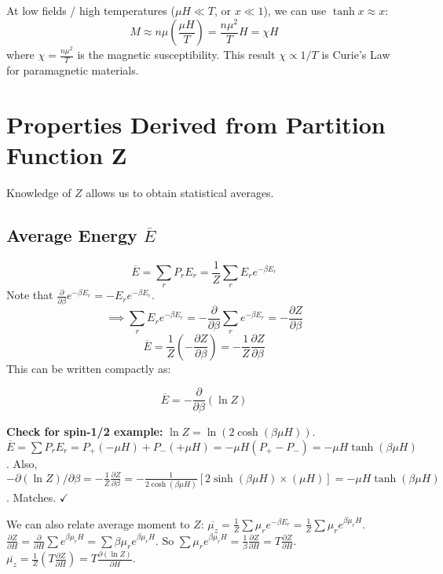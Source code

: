 \documentclass[11pt]{article}
\newcommand{\avg}[1]{\overline{#1}}
\newcommand{\pderiv}[2]{\frac{\partial #1}{\partial #2}}
\newcommand{\partfn}{Z} %
\begin{document}
At low fields / high temperatures ($\mu H \ll T$, or $x \ll 1$), we can use $\tanh x \approx x$:
\[ M \approx n \mu \left( \frac{\mu H}{T} \right) = \frac{n \mu^2}{T} H = \chi H \]
where $\chi = \frac{n \mu^2}{T}$ is the magnetic susceptibility.
This result $\chi \propto 1/T$ is Curie's Law for paramagnetic materials.

\section*{Properties Derived from Partition Function Z}

Knowledge of $Z$ allows us to obtain statistical averages.

\subsection*{Average Energy $\avg{E}$}
\[ \avg{E} = \sum_r P_r E_r = \frac{1}{\partfn} \sum_r E_r e^{-\beta E_r} \]
Note that $\frac{\partial}{\partial \beta} e^{-\beta E_r} = -E_r e^{-\beta E_r}$.
\[ \implies \sum_r E_r e^{-\beta E_r} = -\frac{\partial}{\partial \beta} \sum_r e^{-\beta E_r} = -\pderiv{\partfn}{\beta} \]
\[ \avg{E} = \frac{1}{\partfn} \left( -\pderiv{\partfn}{\beta} \right) = -\frac{1}{\partfn} \pderiv{\partfn}{\beta} \]
This can be written compactly as:
\begin{eqbox}
\[ \avg{E} = -\pderiv{}{\beta} (\ln \partfn) \]
\end{eqbox}

\textbf{Check for spin-1/2 example:}
$\ln Z = \ln(2 \cosh(\beta \mu H))$.
$\avg{E} = \sum P_r E_r = P_+(-\mu H) + P_-(+\mu H) = -\mu H (P_+ - P_-) = -\mu H \tanh(\beta \mu H)$.
Also, $-\partial(\ln Z)/\partial \beta = -\frac{1}{Z} \frac{\partial Z}{\partial \beta} = -\frac{1}{2\cosh(\beta\mu H)} [2 \sinh(\beta\mu H) \times (\mu H)] = -\mu H \tanh(\beta \mu H)$. Matches. $\checkmark$

We can also relate average moment to $Z$:
$\avg{\mu_z} = \frac{1}{Z} \sum \mu_r e^{-\beta E_r} = \frac{1}{Z} \sum \mu_r e^{\beta \mu_r H}$.
$\frac{\partial Z}{\partial H} = \frac{\partial}{\partial H} \sum e^{\beta \mu_r H} = \sum \beta \mu_r e^{\beta \mu_r H}$.
So $\sum \mu_r e^{\beta \mu_r H} = \frac{1}{\beta} \frac{\partial Z}{\partial H} = T \frac{\partial Z}{\partial H}$.
$\avg{\mu_z} = \frac{1}{Z} (T \frac{\partial Z}{\partial H}) = T \frac{\partial (\ln Z)}{\partial H}$.
\end{document}
